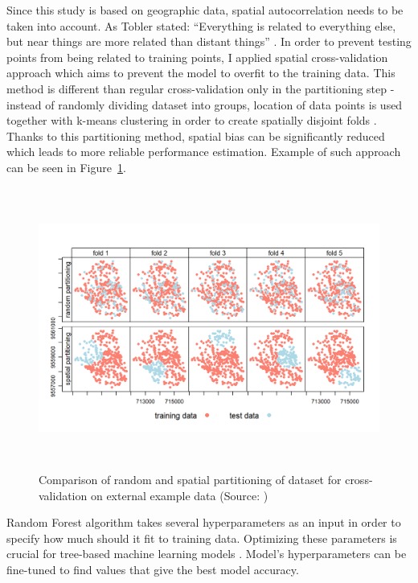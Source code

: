 \documentclass{amuthesis}
\begin{document}
Since this study is based on geographic data, spatial autocorrelation
needs to be taken into account. As Tobler stated: ``Everything is
related to everything else, but near things are more related than
distant things'' \autocite{tobler_computer_1970}. In order to prevent
testing points from being related to training points, I applied spatial
cross-validation approach which aims to prevent the model to overfit to
the training data. This method is different than regular
cross-validation only in the partitioning step - instead of randomly
dividing dataset into groups, location of data points is used together
with k-means clustering \autocite{brenning_spatial_2012} in order to
create spatially disjoint folds \autocite{lovelace_geocomputation_2019}.
Thanks to this partitioning method, spatial bias can be significantly
reduced which leads to more reliable performance estimation. Example of
such approach can be seen in Figure~\ref{fig-rycina5}.

\begin{figure}[H]

{\centering \includegraphics[width=5.9375in,height=3.64583in]{./figures/spatial_partitioning.png}

}

\caption{\label{fig-rycina5}Comparison of random and spatial
partitioning of dataset for cross-validation on external example data
(Source: \textcite{lovelace_geocomputation_2019})}

\end{figure}

Random Forest algorithm takes several hyperparameters as an input in
order to specify how much should it fit to training data. Optimizing
these parameters is crucial for tree-based machine learning models
\autocite{yang_hyperparameter_2020}. Model's hyperparameters can be
fine-tuned to find values that give the best model accuracy.
\end{document}
